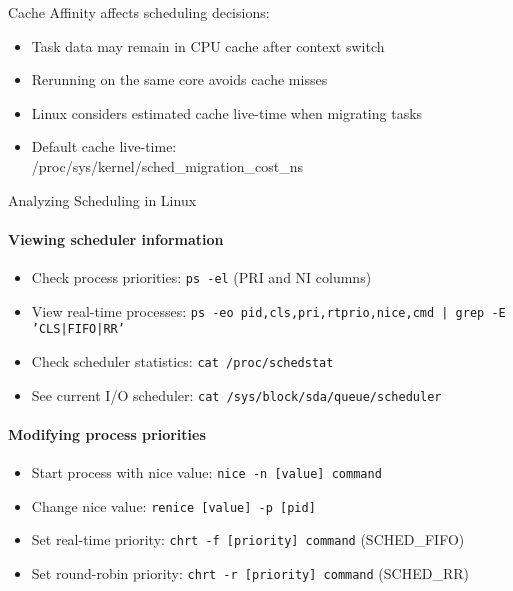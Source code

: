 \begin{definition}{Cache Affinity} affects scheduling decisions:
    \begin{itemize}
        \item Task data may remain in CPU cache after context switch
        \item Rerunning on the same core avoids cache misses
        \item Linux considers estimated cache live-time when migrating tasks
        \item Default cache live-time: \\ /proc/sys/kernel/sched\_migration\_cost\_ns
    \end{itemize}
\end{definition}

\multend

\begin{KR}{Analyzing Scheduling in Linux}
    \paragraph{Viewing scheduler information}
    \begin{itemize}
        \item Check process priorities: \texttt{ps -el} (PRI and NI columns)
        \item View real-time processes: \texttt{ps -eo pid,cls,pri,rtprio,nice,cmd | grep -E 'CLS|FIFO|RR'}
        \item Check scheduler statistics: \texttt{cat /proc/schedstat}
        \item See current I/O scheduler: \texttt{cat /sys/block/sda/queue/scheduler}
    \end{itemize}
    
    \paragraph{Modifying process priorities}
    \begin{itemize}
        \item Start process with nice value: \texttt{nice -n [value] command}
        \item Change nice value: \texttt{renice [value] -p [pid]}
        \item Set real-time priority: \texttt{chrt -f [priority] command} (SCHED\_FIFO)
        \item Set round-robin priority: \texttt{chrt -r [priority] command} (SCHED\_RR)
    \end{itemize}
    

\end{KR}
